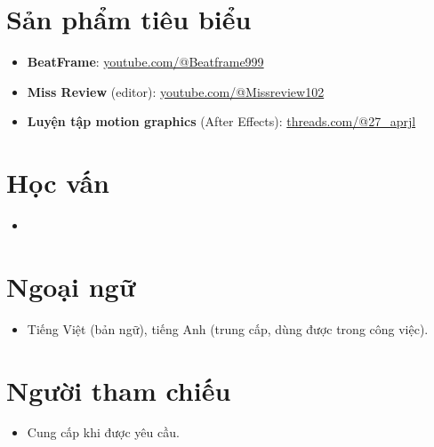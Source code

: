 \documentclass[11pt,a4paper,sans]{moderncv}
\begin{document}

\enlargethispage{2\baselineskip}
\section{Sản phẩm tiêu biểu}
\vspace{1pt}
\begin{itemize}
\item {\textbf{BeatFrame}: \href{https://www.youtube.com/@Beatframe999}{youtube.com/@Beatframe999}}
\item {\textbf{Miss Review} (editor): \href{https://www.youtube.com/@Missreview102}{youtube.com/@Missreview102}}
\item {\textbf{Luyện tập motion graphics} (After Effects): \href{https://www.threads.com/@27_aprjl}{threads.com/@27\_aprjl}}
\end{itemize}


\section{Học vấn}
\vspace{1pt}
\begin{itemize}
\item{}
\end{itemize}


\section{Ngoại ngữ}
\vspace{1pt}
\begin{itemize}
\item {Tiếng Việt (bản ngữ), tiếng Anh (trung cấp, dùng được trong công việc).}
\end{itemize}


\section{Người tham chiếu}
\vspace{1pt}
\begin{itemize}
\item{Cung cấp khi được yêu cầu.}
\end{itemize}
\end{document}
